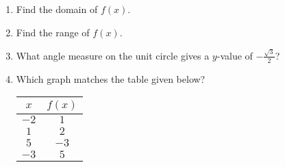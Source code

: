 \documentclass{article}
\begin{document}
\begin{enumerate}
\item Find the domain of $f(x)$.        

        \begin{enumerate}
        \begin{multicols}{4}
              \item $[-3, \infty)$ 
              \item $(-1, -3)$
              \item $(-1, \infty)$
              \item $(-\infty,\infty)$ %
        \end{multicols}
        \end{enumerate}  

\item Find the range of $f(x)$.      

        \begin{enumerate}
        \begin{multicols}{4}
              \item $[-3, \infty)$ %
              \item $(-1, -3)$
              \item $(-1, \infty)$
              \item $(-\infty,\infty)$   
              
        \end{multicols}
        \end{enumerate}
\pagebreak

\item What angle measure on the unit circle gives a $y$-value of $-\frac{\sqrt{3}}{2}$?

\begin{enumerate}
        \end{enumerate}


\item Which graph matches the table given below?

\begin{center}
\begin{tabular}{ |c|c| } 
\hline
$x$ & $f(x)$ \\
\hline
$-2$ & $1$ \\ 
$1$ & $2$ \\ 
$5$ & $-3$ \\
$-3$ & $5$ \\
\hline
\end{tabular}
\end{center}
\vspace{5pt}


\end{enumerate}
\end{document}
